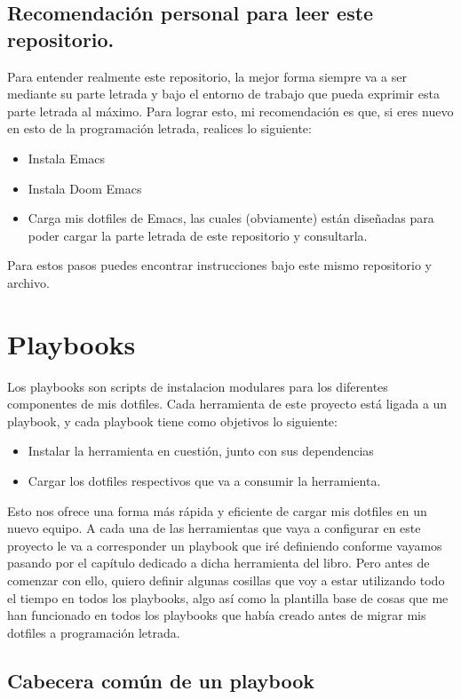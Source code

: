 \documentclass[11pt]{article}
\begin{document}
\subsection{Recomendación personal para leer este repositorio.}
\label{sec:orge41c5d6}
Para entender realmente este repositorio, la mejor forma siempre va a ser mediante su parte letrada y bajo el entorno de trabajo que pueda exprimir esta parte letrada al máximo. Para lograr esto, mi recomendación es que, si eres nuevo en esto de la programación letrada, realices lo siguiente:

\begin{itemize}
\item Instala Emacs
\item Instala Doom Emacs
\item Carga mis dotfiles de Emacs, las cuales (obviamente) están diseñadas para poder cargar la parte letrada de este repositorio y consultarla.
\end{itemize}

Para estos pasos puedes encontrar instrucciones bajo este mismo repositorio y archivo.
\section{Playbooks}
\label{sec:org4eee5c7}

Los playbooks son scripts de instalacion modulares para los diferentes componentes de mis dotfiles. Cada herramienta de este proyecto está ligada a un playbook, y cada playbook tiene como objetivos lo siguiente:

\begin{itemize}
\item Instalar la herramienta en cuestión, junto con sus dependencias
\item Cargar los dotfiles respectivos que va a consumir la herramienta.
\end{itemize}

Esto nos ofrece una forma más rápida y eficiente de cargar mis dotfiles en un nuevo equipo. A cada una de las herramientas que vaya a configurar en este proyecto le va a corresponder un playbook que iré definiendo conforme vayamos pasando por el capítulo dedicado a dicha herramienta del libro. Pero antes de comenzar con ello, quiero definir algunas cosillas que voy a estar utilizando todo el tiempo en todos los playbooks, algo así como la plantilla base de cosas que me han funcionado en todos los playbooks que había creado antes de migrar mis dotfiles a programación letrada.
\subsection{Cabecera común de un playbook}
\label{sec:org81af12a}
\end{document}
